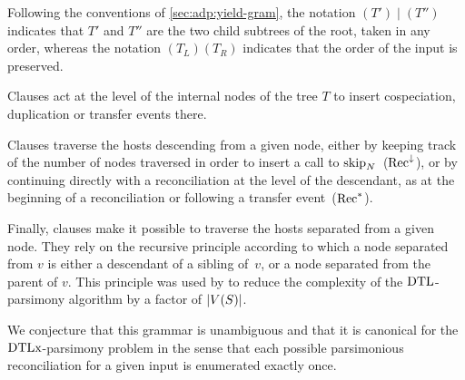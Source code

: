Following the conventions of \cref{sec:adp:yield-gram}, the notation \((T')\mid(T'')\) indicates that \(T'\) and \(T''\) are the two child subtrees of the root, taken in any order, whereas the notation \((T_L)(T_R)\) indicates that the order of the input is preserved.

Clauses  act at the level of the internal nodes of the tree \(T\) to insert cospeciation, duplication or transfer events there.

Clauses  traverse the hosts descending from a given node,
either by keeping track of the number of nodes traversed in order to insert a call to \(\mathrm{skip}_N\)~(\(\mathrm{Rec}^{\downarrow}\)),
or by continuing directly with a reconciliation at the level of the descendant, as at the beginning of a reconciliation or following a transfer event~(\(\mathrm{Rec}^{\ast}\)).

Finally, clauses  make it possible to traverse the hosts separated from a given node.
They rely on the recursive principle according to which a node separated from \(v\) is either a descendant of a sibling of~\(v\), or a node separated from the parent of \(v\).
This principle was used by \textcite{Bansal2012EfficientAlgorithmsReconciliation} to reduce the complexity of the \(\mathrm{D}\mathrm{T}\mathrm{L}\)-parsimony algorithm by a factor of \(|V(S)|\).

We conjecture that this grammar is unambiguous and that it is canonical for the \(\mathrm{D}\mathrm{T}\mathrm{L}\mathrm{x}\)-parsimony problem in the sense that each possible parsimonious reconciliation for a given input is enumerated exactly once.

